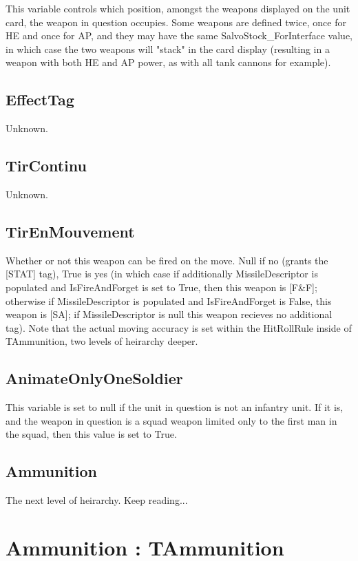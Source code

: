 \documentclass{article}
\begin{document}
This variable controls which position, amongst the weapons displayed on the unit card, the weapon in question occupies. Some weapons are defined twice, once for HE and once for AP, and they may have the same SalvoStock\_ForInterface value, in which case the two weapons will "stack" in the card display (resulting in a weapon with both HE and AP power, as with all tank cannons for example).

\subsection{EffectTag}

Unknown.

\subsection{TirContinu}

Unknown.

\subsection{TirEnMouvement}

Whether or not this weapon can be fired on the move. Null if no (grants the [STAT] tag), True is yes (in which case if additionally MissileDescriptor is populated and IsFireAndForget is set to True, then this weapon is [F\&F]; otherwise if MissileDescriptor is populated and IsFireAndForget is False, this weapon is [SA]; if MissileDescriptor is null this weapon recieves no additional tag). Note that the actual moving accuracy is set within the HitRollRule inside of TAmmunition, two levels of heirarchy deeper.

\subsection{AnimateOnlyOneSoldier}

This variable is set to null if the unit in question is not an infantry unit. If it is, and the weapon in question is a squad weapon limited only to the first man in the squad, then this value is set to True.

\subsection{Ammunition}

The next level of heirarchy. Keep reading...

\section{Ammunition : TAmmunition}
\end{document}
